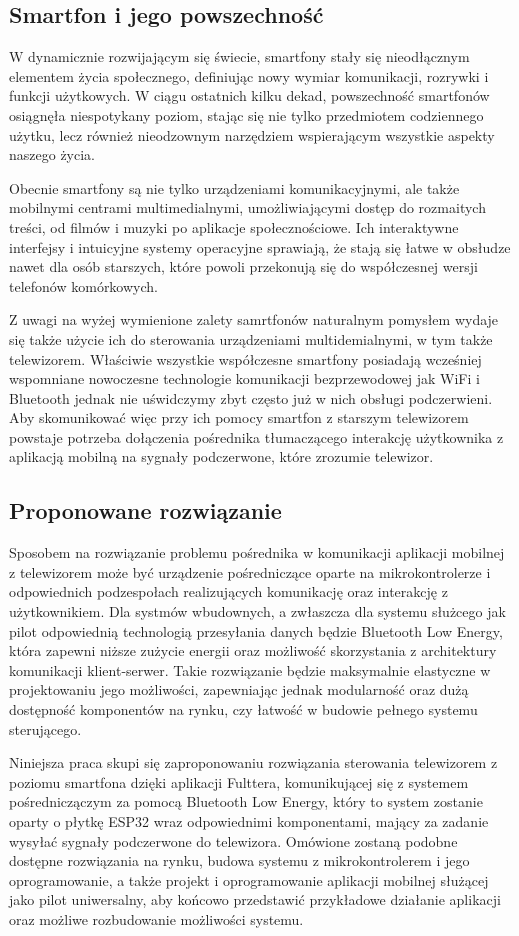 \documentclass[12pt,twoside]{article}
\begin{document}
\subsection{Smartfon i jego powszechność}
{W dynamicznie rozwijającym się świecie, smartfony stały się nieodłącznym elementem życia społecznego, 
definiując nowy wymiar komunikacji, rozrywki i funkcji użytkowych. 
W ciągu ostatnich kilku dekad, powszechność smartfonów osiągnęła niespotykany poziom, 
stając się nie tylko przedmiotem codziennego użytku, lecz również nieodzownym 
narzędziem wspierającym wszystkie aspekty naszego życia.

Obecnie smartfony są nie tylko urządzeniami komunikacyjnymi, ale także mobilnymi centrami multimedialnymi,
 umożliwiającymi dostęp do rozmaitych treści, od filmów i muzyki po aplikacje społecznościowe. 
 Ich interaktywne interfejsy i intuicyjne systemy operacyjne sprawiają, że stają się łatwe w obsłudze nawet dla osób starszych, 
 które powoli przekonują się do współczesnej wersji telefonów komórkowych.

 Z uwagi na wyżej wymienione zalety samrtfonów naturalnym pomysłem wydaje się także użycie ich do 
 sterowania urządzeniami multidemialnymi, w tym także telewizorem. Właściwie wszystkie współczesne smartfony posiadają 
 wcześniej wspomniane nowoczesne technologie komunikacji bezprzewodowej jak WiFi i Bluetooth jednak nie uświdczymy
 zbyt często już w nich obsługi podczerwieni. Aby skomunikować więc przy ich pomocy smartfon
 z starszym telewizorem powstaje potrzeba dołączenia pośrednika tłumaczącego interakcję 
 użytkownika z aplikacją mobilną na sygnały podczerwone, które zrozumie telewizor.}

\subsection{Proponowane rozwiązanie}
{Sposobem na rozwiązanie problemu pośrednika w komunikacji aplikacji mobilnej z telewizorem
może być urządzenie pośredniczące oparte na mikrokontrolerze i odpowiednich podzespołach 
realizujących komunikację oraz interakcję z użytkownikiem. Dla systmów wbudownych, a zwłaszcza
dla systemu służcego jak pilot odpowiednią technologią przesyłania danych będzie Bluetooth Low Energy,
która zapewni niższe zużycie energii oraz możliwość skorzystania z architektury komunikacji klient-serwer.
 Takie rozwiązanie będzie maksymalnie elastyczne w projektowaniu jego możliwości, zapewniając jednak modularność
oraz dużą dostępność komponentów na rynku, czy łatwość w budowie pełnego systemu sterującego.

Niniejsza praca skupi się zaproponowaniu rozwiązania sterowania telewizorem z poziomu 
smartfona dzięki aplikacji Fulttera, komunikującej się z systemem pośredniczączym za pomocą 
Bluetooth Low Energy, który to system zostanie oparty o płytkę ESP32 wraz odpowiednimi komponentami,
mający za zadanie wysyłać sygnały podczerwone do telewizora. 
Omówione zostaną podobne dostępne rozwiązania na rynku, budowa systemu z
 mikrokontrolerem i jego oprogramowanie, a także projekt i oprogramowanie aplikacji
mobilnej służącej jako pilot uniwersalny, aby końcowo przedstawić przykładowe działanie 
aplikacji oraz możliwe rozbudowanie możliwości systemu.}
\end{document}
